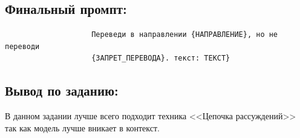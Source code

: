\subsection{Финальный промпт:}
\begin{verbatim}
					Переведи в направлении {НАПРАВЛЕНИЕ}, но не переводи
					{ЗАПРЕТ_ПЕРЕВОДА}. текст: ТЕКСТ}
\end{verbatim}
\subsection{Вывод по заданию:}
\indent В данном задании лучше всего подходит техника <<Цепочка рассуждений>> так как модель лучше вникает в контекст. \\